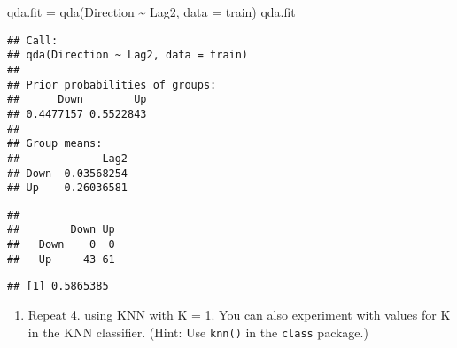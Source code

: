 \documentclass[
]{article}
\newenvironment{Shaded}{\begin{snugshade}}{\end{snugshade}}
\newcommand{\AttributeTok}[1]{\textcolor[rgb]{0.77,0.63,0.00}{#1}}
\newcommand{\FunctionTok}[1]{\textcolor[rgb]{0.00,0.00,0.00}{#1}}
\newcommand{\NormalTok}[1]{#1}
\newcommand{\OtherTok}[1]{\textcolor[rgb]{0.56,0.35,0.01}{#1}}
\newcommand{\SpecialCharTok}[1]{\textcolor[rgb]{0.00,0.00,0.00}{#1}}
\newcommand{\StringTok}[1]{\textcolor[rgb]{0.31,0.60,0.02}{#1}}
\providecommand{\tightlist}{%
  \setlength{\itemsep}{0pt}\setlength{\parskip}{0pt}}
\begin{document}
\begin{Shaded}
\begin{Highlighting}[]
\NormalTok{qda.fit }\OtherTok{=} \FunctionTok{qda}\NormalTok{(Direction }\SpecialCharTok{\textasciitilde{}}\NormalTok{ Lag2, }\AttributeTok{data =}\NormalTok{ train)}
\NormalTok{qda.fit}
\end{Highlighting}
\end{Shaded}

\begin{verbatim}
## Call:
## qda(Direction ~ Lag2, data = train)
## 
## Prior probabilities of groups:
##      Down        Up 
## 0.4477157 0.5522843 
## 
## Group means:
##             Lag2
## Down -0.03568254
## Up    0.26036581
\end{verbatim}

\begin{Shaded}
\end{Shaded}

\begin{verbatim}
##       
##        Down Up
##   Down    0  0
##   Up     43 61
\end{verbatim}

\begin{Shaded}
\end{Shaded}

\begin{verbatim}
## [1] 0.5865385
\end{verbatim}

\begin{enumerate}
\def\labelenumi{\arabic{enumi}.}
\setcounter{enumi}{6}
\tightlist
\item
  Repeat 4. using KNN with K = 1. You can also experiment with values
  for K in the KNN classifier. (Hint: Use \texttt{knn()} in the
  \texttt{class} package.)
\end{enumerate}
\end{document}
